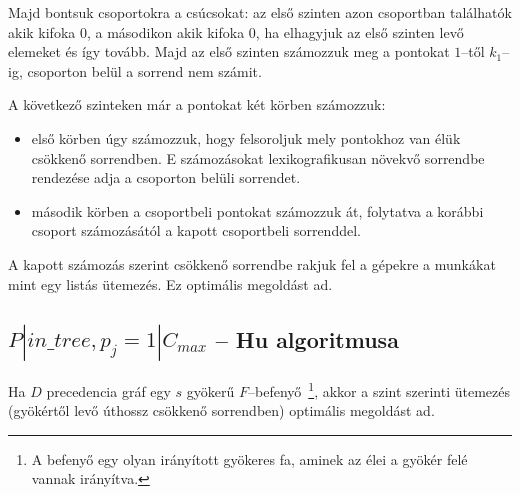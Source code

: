 Majd bontsuk csoportokra a csúcsokat: az első szinten azon csoportban találhatók
akik kifoka $0$, a másodikon akik kifoka $0$, ha elhagyjuk az első szinten levő
elemeket és így tovább. Majd az első szinten számozzuk meg a pontokat $1$--től
$k_1$--ig, csoporton belül a sorrend nem számit.

A következő szinteken már a pontokat két körben számozzuk:
\begin{itemize}
	\item első körben úgy számozzuk, hogy felsoroljuk mely pontokhoz van élük
	      csökkenő sorrendben. E számozásokat lexikografikusan növekvő sorrendbe
	      rendezése adja a csoporton belüli sorrendet.
	\item második körben a csoportbeli pontokat számozzuk át, folytatva a korábbi
	      csoport számozásától a kapott csoportbeli sorrenddel.
\end{itemize}

A kapott számozás szerint csökkenő sorrendbe rakjuk fel a gépekre a munkákat mint
egy listás ütemezés. Ez optimális megoldást ad.


\subsection{ \texorpdfstring{$ P|in\_tree, p_j=1|C_{max} $} {P|in-tree,pj=1|Cmax} -- Hu algoritmusa}

Ha $D$ precedencia gráf egy $s$ gyökerű $F$--befenyő~\footnote{A befenyő egy
	olyan irányított gyökeres fa, aminek az élei a gyökér felé vannak irányítva.},
akkor a szint szerinti ütemezés (gyökértől levő úthossz csökkenő sorrendben)
optimális megoldást ad.

